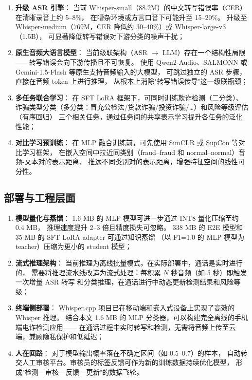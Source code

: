 \documentclass[11pt,a4paper]{ctexart}
\begin{document}
\begin{enumerate}[label=(\arabic*)]
  \item \textbf{升级 ASR 引擎}：
  当前 Whisper-small（88.2M）的中文转写错误率（CER）在清晰录音上约 5--8\%，
  在嘈杂环境或方言口音下可能升至 15--20\%。
  升级至 Whisper-medium（769M，CER 降低约 30--40\%）或 Whisper-large-v3（1.5B），
  可显著降低转写错误对下游分类的噪声干扰；

  \item \textbf{原生音频大语言模型}：
  当前级联架构（ASR $\rightarrow$ LLM）存在一个结构性局限——转写错误会向下游传播且不可恢复。
  使用 Qwen2-Audio、SALMONN 或 Gemini-1.5-Flash 等原生支持音频输入的大模型，
  可跳过独立的 ASR 步骤，直接在音频 token 上进行推理，
  从根本上消除"转写错误传导"这一级联瓶颈；

  \item \textbf{多任务联合学习}：
  在 SFT LoRA 框架下，可同时训练欺诈检测（二分类）、
  诈骗类型分类（多分类：冒充公检法/贷款诈骗/投资诈骗/…）和风险等级评估（有序回归）
  三个相关任务，通过任务间的共享表示学习提升各任务的泛化性能；

  \item \textbf{对比学习预训练}：
  在 MLP 融合训练前，可先使用 SimCLR 或 SupCon 等对比学习框架，
  在嵌入空间中拉近同类别（fraud--fraud 和 normal--normal）音频-文本对的表示距离、
  推远不同类别对的表示距离，增强特征空间的线性可分性。
\end{enumerate}

\subsection{部署与工程层面}

\begin{enumerate}[label=(\arabic*)]
  \item \textbf{模型量化与蒸馏}：
  1.6 MB 的 MLP 模型可进一步通过 INT8 量化压缩至约 0.4 MB，
  推理速度提升 2--3 倍且精度损失可忽略。
  338 MB 的 E2E 模型和 35 MB 的 SFT LoRA adapter 可通过知识蒸馏
  （以 F1=1.0 的 MLP 模型为 teacher）压缩为更小的 student 模型；

  \item \textbf{流式推理架构}：
  当前推理为离线批量模式。在实际部署中，通话是实时进行的，
  需要将推理流水线改造为流式处理：每积累 $N$ 秒音频（如 5 秒）即触发一次增量 ASR 转写
  和分类推理，在通话进行中动态更新检测结果和风险等级；

  \item \textbf{终端侧部署}：
  Whisper.cpp 项目\cite{whisper_cpp}已在移动端和嵌入式设备上实现了高效的 Whisper 推理。
  结合本文 1.6 MB 的 MLP 分类器，可以构建完全离线的手机端电诈检测应用——
  在通话过程中实时转写和检测，无需将音频上传至云端，兼顾隐私保护和低延迟；

  \item \textbf{人在回路}：
  对于模型输出概率落在不确定区间（如 0.5--0.7）的样本，
  自动转交人工审核平台。审核员的标签反馈可作为新的训练数据持续优化模型，
  形成"检测—审核—反馈—更新"的数据飞轮。
\end{enumerate}
\end{document}
